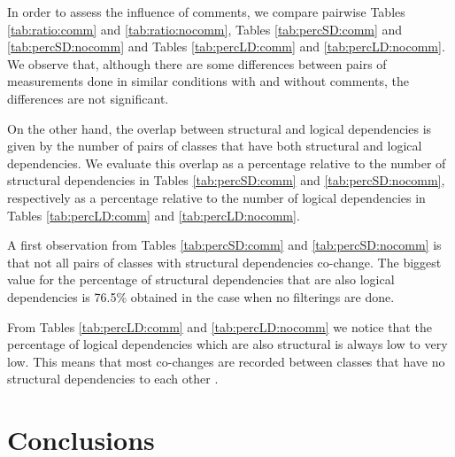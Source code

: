 \documentclass[12pt]{mitthesis}
\begin{document}
In order to assess the influence of comments, we compare pairwise Tables \ref{tab:ratio:comm} and \ref{tab:ratio:nocomm},  
Tables \ref{tab:percSD:comm} and \ref{tab:percSD:nocomm} and Tables \ref{tab:percLD:comm} and \ref{tab:percLD:nocomm}. 
We observe that, although there are some differences between pairs of measurements done in similar conditions with and without comments, the differences are not significant.

On the other hand, the overlap between structural and logical dependencies is given by the number of pairs of classes that have both structural and logical dependencies. We evaluate this overlap as a percentage relative to the number of structural dependencies in Tables \ref{tab:percSD:comm} and \ref{tab:percSD:nocomm}, respectively as  a percentage relative to the number of logical dependencies in Tables \ref{tab:percLD:comm} and \ref{tab:percLD:nocomm}.

A first observation from Tables \ref{tab:percSD:comm} and \ref{tab:percSD:nocomm} is that not all pairs of classes with structural dependencies co-change. The biggest value for the percentage of structural dependencies that are also logical dependencies is 76.5\% obtained in the case when no filterings are done.

From Tables \ref{tab:percLD:comm} and \ref{tab:percLD:nocomm} we notice that the percentage of logical dependencies which are also structural is always low to very low. This means that most co-changes are recorded between classes that have no structural dependencies to each other \cite{enase19}.   
 

\chapter{Conclusions}
\label{conclusions}





\end{document}

